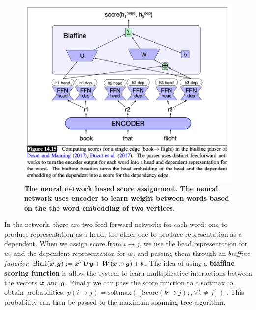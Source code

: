 \documentclass[11pt]{article}
\begin{document}
\begin{figure}
\begin{minipage}[t]{1\linewidth}
  \centering
  \centerline{\includegraphics[scale = 0.4]{nn_score_asigning_dep_parse.png}}
\end{minipage}
\caption{\footnotesize{\textbf{The neural network based score assignment. The neural network uses encoder to learn weight between words based on the the word embedding of two vertices}.}}
\label{fig: nn_score_asigning_dep_parse}
\end{figure}

In the network, there are two feed-forward networks for each word: one to produce representation as a head, the other one to produce representation as a dependent. When we assign score from $i\rightarrow j$, we use the head representation for $w_i$ and the dependent representation for $w_{j}$ and passing them through an \emph{biaffine function} $\text{Biaff}(\boldsymbol{x}, \boldsymbol{y}):= \boldsymbol{x}^{T}\boldsymbol{U}\boldsymbol{y} + \boldsymbol{W}(\boldsymbol{x}\oplus \boldsymbol{y}) + b$. The idea of using a \textbf{biaffine scoring function} is allow the system to learn multiplicative interactions between the vectors $\boldsymbol{x}$ and $\boldsymbol{y}$. Finally we can pass the score function to a softmax to obtain probabilities. $p(i\rightarrow j) = \text{softmax}([\text{Score}(k\rightarrow j);, \forall k\neq j])$ . This probability can then be passed to the maximum spanning tree algorithm.
\end{document}

